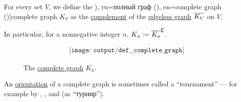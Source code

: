 \begin{definition}\label{def:complete_graph}\mimprovised
  For every set \( V \), we define the \term[bg=пълен граф (\cite[12]{Мирчев2001}), ru=полный граф (\cite[10]{Емеличев1990}), en=complete graph (\cite[def. 1.3.1]{Knauer2011})]{complete graph} \( K_V \) as the \hyperref[def:graph_complement]{complement} of the \hyperref[def:edgeless_graph]{edgeless graph} \( \oline{K_V} \) on \( V \).

  In particular, for a nonnegative integer \( n \), \( K_n \coloneqq \oline{K_n}^{\complement} \).

  \begin{figure}[!ht]
    \begin{equation}\label{eq:fig:def:complete_graph/k4}
      \begin{aligned}
        \texttt{[image: output/def\_\_complete\_graph]}
      \end{aligned}
    \end{equation}
    \caption{The \hyperref[def:complete_graph]{complete graph} \( K_4 \).}\label{fig:def:complete_graph/k4}
  \end{figure}
\end{definition}
\begin{comments}
  \item An \hyperref[def:graph_orientation]{orientation} of a complete graph is sometimes called a \enquote{tournament} --- for example by , ,  and  (as \enquote{турнир}).
\end{comments}

